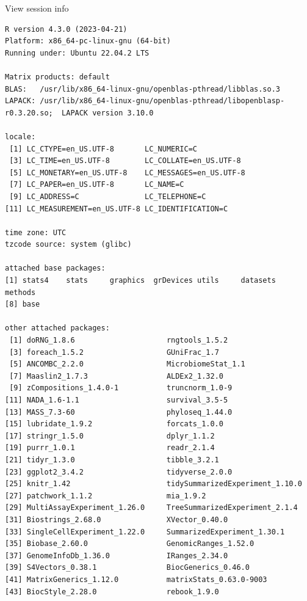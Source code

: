 \documentclass[
]{book}
\begin{document}
View session info

\begin{verbatim}
R version 4.3.0 (2023-04-21)
Platform: x86_64-pc-linux-gnu (64-bit)
Running under: Ubuntu 22.04.2 LTS

Matrix products: default
BLAS:   /usr/lib/x86_64-linux-gnu/openblas-pthread/libblas.so.3 
LAPACK: /usr/lib/x86_64-linux-gnu/openblas-pthread/libopenblasp-r0.3.20.so;  LAPACK version 3.10.0

locale:
 [1] LC_CTYPE=en_US.UTF-8       LC_NUMERIC=C              
 [3] LC_TIME=en_US.UTF-8        LC_COLLATE=en_US.UTF-8    
 [5] LC_MONETARY=en_US.UTF-8    LC_MESSAGES=en_US.UTF-8   
 [7] LC_PAPER=en_US.UTF-8       LC_NAME=C                 
 [9] LC_ADDRESS=C               LC_TELEPHONE=C            
[11] LC_MEASUREMENT=en_US.UTF-8 LC_IDENTIFICATION=C       

time zone: UTC
tzcode source: system (glibc)

attached base packages:
[1] stats4    stats     graphics  grDevices utils     datasets  methods  
[8] base     

other attached packages:
 [1] doRNG_1.8.6                     rngtools_1.5.2                 
 [3] foreach_1.5.2                   GUniFrac_1.7                   
 [5] ANCOMBC_2.2.0                   MicrobiomeStat_1.1             
 [7] Maaslin2_1.7.3                  ALDEx2_1.32.0                  
 [9] zCompositions_1.4.0-1           truncnorm_1.0-9                
[11] NADA_1.6-1.1                    survival_3.5-5                 
[13] MASS_7.3-60                     phyloseq_1.44.0                
[15] lubridate_1.9.2                 forcats_1.0.0                  
[17] stringr_1.5.0                   dplyr_1.1.2                    
[19] purrr_1.0.1                     readr_2.1.4                    
[21] tidyr_1.3.0                     tibble_3.2.1                   
[23] ggplot2_3.4.2                   tidyverse_2.0.0                
[25] knitr_1.42                      tidySummarizedExperiment_1.10.0
[27] patchwork_1.1.2                 mia_1.9.2                      
[29] MultiAssayExperiment_1.26.0     TreeSummarizedExperiment_2.1.4 
[31] Biostrings_2.68.0               XVector_0.40.0                 
[33] SingleCellExperiment_1.22.0     SummarizedExperiment_1.30.1    
[35] Biobase_2.60.0                  GenomicRanges_1.52.0           
[37] GenomeInfoDb_1.36.0             IRanges_2.34.0                 
[39] S4Vectors_0.38.1                BiocGenerics_0.46.0            
[41] MatrixGenerics_1.12.0           matrixStats_0.63.0-9003        
[43] BiocStyle_2.28.0                rebook_1.9.0                   


\end{verbatim}
\end{document}

